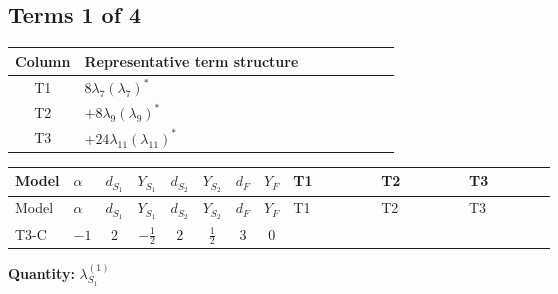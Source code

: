 \documentclass[8pt]{article}
\begin{document}
\begin{landscape}
\subsection*{Terms 1 of 4}
\begin{center}
\begin{tabular}{@{}c >{\raggedright\arraybackslash}p{0.82\linewidth}@{}}
\toprule
Column & Representative term structure \\
\midrule
T1 & \(\displaystyle 8 {\lambda_{7}} \left({\lambda_{7}}\right)^{*}\) \\
\midrule
T2 & \(\displaystyle +8 {\lambda_{9}} \left({\lambda_{9}}\right)^{*}\) \\
\midrule
T3 & \(\displaystyle +24 {\lambda_{11}} \left({\lambda_{11}}\right)^{*}\) \\
\midrule
\bottomrule
\end{tabular}
\end{center}
\smallskip
\tiny
\begin{longtable}{@{}llcccccc >{\raggedright\arraybackslash}p{0.21\linewidth} >{\raggedright\arraybackslash}p{0.21\linewidth} >{\raggedright\arraybackslash}p{0.21\linewidth}@{}}
\toprule
Model & $\alpha$ & $d_{S_1}$ & $Y_{S_1}$ & $d_{S_2}$ & $Y_{S_2}$ & $d_F$ & $Y_F$ & T1 & T2 & T3 \\
\midrule
\endfirsthead
\toprule
Model & $\alpha$ & $d_{S_1}$ & $Y_{S_1}$ & $d_{S_2}$ & $Y_{S_2}$ & $d_F$ & $Y_F$ & T1 & T2 & T3 \\
\midrule
\endhead
T3-C & $-1$ & $2$ & $-\frac{1}{2}$ & $2$ & $\frac{1}{2}$ & $3$ & $0$ & \scriptsize\adjustbox{max width=\linewidth}{$\begin{gathered} 8 {\lambda_{7}} \left({\lambda_{7}}\right)^{*}\end{gathered}$} & \scriptsize\adjustbox{max width=\linewidth}{$\begin{gathered} +8 {\lambda_{9}} \left({\lambda_{9}}\right)^{*}\end{gathered}$} & \scriptsize\adjustbox{max width=\linewidth}{$\begin{gathered} +24 {\lambda_{11}} \left({\lambda_{11}}\right)^{*}\end{gathered}$} \\
\midrule
\bottomrule
\end{longtable}
\clearpage
\noindent\textbf{Quantity: }$\lambda_{S_1}^{(1)}$\par\smallskip

\end{landscape}
\end{document}
